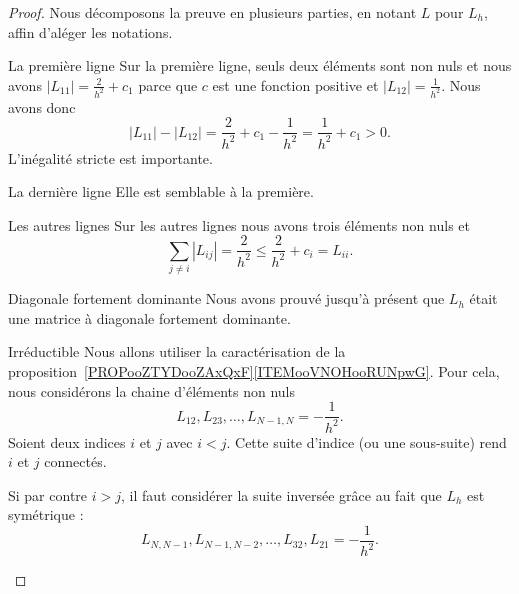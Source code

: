 \begin{proof}
    Nous décomposons la preuve en plusieurs parties, en notant \( L\) pour \( L_h\), affin d'aléger les notations.
    \begin{subproof}
        \item[La première ligne]
            Sur la première ligne, seuls deux éléments sont non nuls et nous avons \( | L_{11} |=\frac{ 2 }{ h^2 }+c_1\) parce que \( c\) est une fonction positive et \( | L_{12}|=\frac{1}{ h^2 }\). Nous avons donc
        \begin{equation}
            | L_{11} |-| L_{12} |=\frac{ 2 }{ h^2 }+c_1-\frac{1}{ h^2 }=\frac{1}{ h^2 }+c_1>0.
        \end{equation}
        L'inégalité stricte est importante.

        \item[La dernière ligne]
        Elle est semblable à la première.

        \item[Les autres lignes]
        Sur les autres lignes nous avons trois éléments non nuls et
        \begin{equation}
            \sum_{j\neq i}| L_{ij} |=\frac{ 2 }{ h^2 }\leq \frac{ 2 }{ h^2 }+c_i=L_{ii}.
        \end{equation}

        \item[Diagonale fortement dominante]
        Nous avons prouvé jusqu'à présent que \( L_h\) était une matrice à diagonale fortement dominante.

        \item[Irréductible]
        Nous allons utiliser la caractérisation de la proposition~\ref{PROPooZTYDooZAxQxF}\ref{ITEMooVNOHooRUNpwG}. Pour cela, nous considérons la chaine d'éléments non nuls
        \begin{equation}
            L_{12}, L_{23},\ldots, L_{N-1,N}=-\frac{1}{ h^2 }.
        \end{equation}
        Soient deux indices \( i\) et \( j\) avec \( i<j\). Cette suite d'indice (ou une sous-suite) rend \( i\) et \( j\) connectés.

        Si par contre \( i>j\), il faut considérer la suite inversée grâce au fait que \( L_h\) est symétrique :
        \begin{equation}
            L_{N,N-1},L_{N-1,N-2},\ldots, L_{32}, L_{21}=-\frac{ 1 }{ h^2 }.
        \end{equation}
    \end{subproof}
\end{proof}

